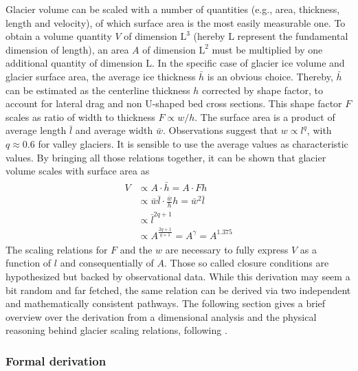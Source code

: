             Glacier volume can be scaled with a number of quantities (e.g., area, thickness, length and velocity), of which surface area is the most easily measurable one. To obtain a volume quantity $V$ of dimension $\mathrm{L}^3$ (hereby $\mathrm{L}$ represent the fundamental dimension of length), an area $A$ of dimension $\mathrm{L}^2$ must be multiplied by one additional quantity of dimension $\mathrm{L}$. In the specific case of glacier ice volume and glacier surface area, the average ice thickness $\bar{h}$ is an obvious choice. Thereby, $\bar{h}$ can be estimated as the centerline thickness $h$ corrected by shape factor, to account for lateral drag and non U-shaped bed cross sections. This shape factor $F$ scales as ratio of width to thickness $F\propto w/h$. The surface area is a product of average length $\bar l$ and average width $\bar w$. Observations suggest that $w\propto l^q$, with $q\approx 0.6$ for valley glaciers. It is sensible to use the average values as characteristic values. By bringing all those relations together, it can be shown that glacier volume scales with surface area as
            \begin{align}
            \begin{split}
                V &\propto A\cdot \bar{h} = A\cdot Fh \\
                    &\propto \bar w\bar l\cdot \frac{\bar w}{h}h = \bar w^2\bar l \\
                    &\propto \bar l^{2q+1} \\
                    &\propto A^\frac{2q+1}{q+1} = A^\gamma = A^{1.375}
            \end{split}
            \end{align}
            The scaling relations for $F$ and the $w$ are necessary to fully express $V$ as a function of $l$ and consequentially of $A$. Those so called closure conditions are hypothesized but backed by observational data. While this derivation may seem a bit random and far fetched, the same \vas{} relation can be derived via two independent and mathematically consistent pathways. The following section gives a brief overview over the derivation from a dimensional analysis and the physical reasoning behind glacier scaling relations, following \citet[Section 4 - 7]{Bahr2015}.
        
        
        \subsubsection{Formal derivation} %
        \label{ssub:formal_derivation}

